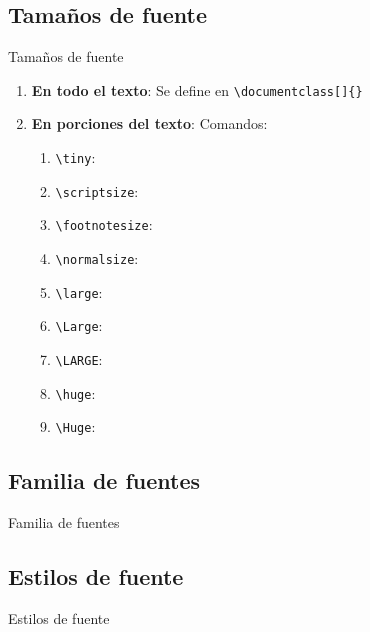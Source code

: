 \documentclass[../slides.tex]{subfiles}
\begin{document}
    \begin{frame}
        \tableofcontents[sections=\value{section}]
    \end{frame}
    
    \subsection{Tamaños de fuente}
    \begin{frame}{Tamaños de fuente}
        \begin{enumerate}
            \item \textbf{En todo el texto}: Se define en \texttt{\textbackslash documentclass[]\{\}}

            \item \textbf{En porciones del texto}:
                Comandos:
                \begin{enumerate}
                    \item \texttt{\textbackslash tiny}:
                    \item \texttt{\textbackslash scriptsize}:
                    \item \texttt{\textbackslash footnotesize}:
                    \item \texttt{\textbackslash normalsize}:
                    \item \texttt{\textbackslash large}:
                    \item \texttt{\textbackslash Large}:
                    \item \texttt{\textbackslash LARGE}:
                    \item \texttt{\textbackslash huge}:
                    \item \texttt{\textbackslash Huge}:
                \end{enumerate}
                
        \end{enumerate}
    \end{frame}
    \subsection{Familia de fuentes}
    \begin{frame}{Familia de fuentes}
        
    \end{frame}
    \subsection{Estilos de fuente}
    \begin{frame}{Estilos de fuente}
        
    \end{frame}
\end{document}
